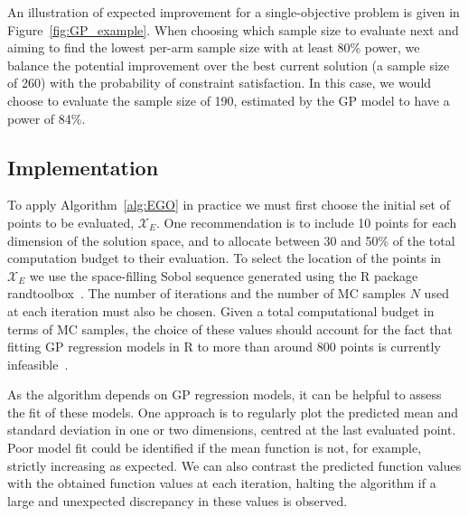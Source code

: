 \documentclass[sagev, doublespace, Crown]{sagej}
\begin{document}
An illustration of expected improvement for a single-objective problem is given in Figure~\ref{fig:GP_example}. When choosing which sample size to evaluate next and aiming to find the lowest per-arm sample size with at least 80\% power, we balance the potential improvement over the best current solution (a sample size of 260) with the probability of constraint satisfaction. In this case, we would choose to evaluate the sample size of 190, estimated by the GP model to have a power of 84\%.


\subsection{Implementation}

To apply Algorithm~\ref{alg:EGO} in practice we must first choose the initial set of points to be evaluated, $\mathcal{X}_{E}$. One recommendation is to include 10 points for each dimension of the solution space, and to allocate between 30 and 50\% of the total computation budget to their evaluation\cite{Picheny2010}. To select the location of the points in $\mathcal{X}_{E}$ we use the space-filling Sobol sequence generated using the R package randtoolbox~\cite{Dutang2015}. The number of iterations and the number of MC samples $N$ used at each iteration must also be chosen. Given a total computational budget in terms of MC samples, the choice of these values should account for the fact that fitting GP regression models in R to more than around 800 points is currently infeasible~\cite{Chevalier2014}. 

As the algorithm depends on GP regression models, it can be helpful to assess the fit of these models. One approach is to regularly plot the predicted mean and standard deviation in one or two dimensions, centred at the last evaluated point. Poor model fit could be identified if the mean function is not, for example, strictly increasing as expected. We can also contrast the predicted function values with the obtained function values at each iteration, halting the algorithm if a large and unexpected discrepancy in these values is observed.
\end{document}
